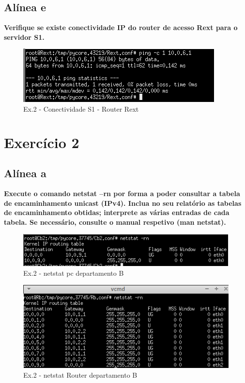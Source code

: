 \documentclass[a4paper]{report}
\begin{document}
\subsection{Alínea e}
\textbf{Verifique se existe conectividade IP do router de acesso Rext para o servidor S1.}

\begin{figure}[H]
    \centering 
    \includegraphics[width=\textwidth]{images/RextPing.png}
    \caption{Ex.2 - Conectividade S1 - Router Rext}
    \label{fig:RextPing}
\end{figure}

\section{Exercício 2}

\subsection{Alínea a}
\textbf{Execute o comando netstat –rn por forma a poder consultar a tabela de
encaminhamento unicast (IPv4). Inclua no seu relatório as tabelas de encaminhamento
obtidas; interprete as várias entradas de cada tabela. Se necessário, consulte o manual
respetivo (man netstat).}

\begin{figure}[H]
    \centering 
    \includegraphics[width=\textwidth]{images/netstatPcEx2P2.png}
    \caption{Ex.2 - netstat pc departamento B}
    \label{fig:netstatPcEx2P2}
\end{figure}

\begin{figure}[H]
    \centering 
    \includegraphics[width=\textwidth]{images/netstatRouterEx2P2.png}
    \caption{Ex.2 - netstat Router departamento B}
    \label{fig:netstatRouterEx2P2}
\end{figure}
\end{document}

